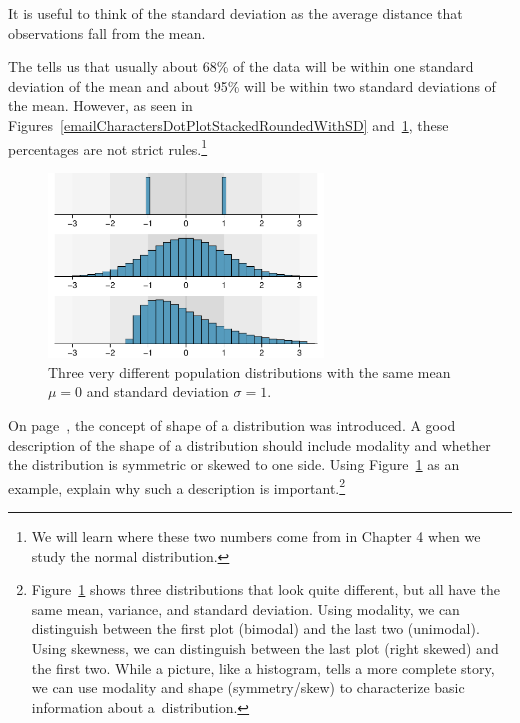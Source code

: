 \begin{tipBox}{
It is useful to think of the standard deviation as the average distance that observations fall from the mean.}
\end{tipBox}

The  tells us that usually about 68\% of the data will be within one standard deviation of the mean and about 95\% will be within two standard deviations of the mean. However, as seen in Figures~\ref{emailCharactersDotPlotStackedRoundedWithSD} and~\ref{severalDiffDistWithSdOf1}, these percentages are not strict rules.\footnote{We will learn where these two numbers come from in Chapter 4 when we study the normal distribution.}

\begin{figure}
\centering
\includegraphics[width=0.65\textwidth]{ch_summarizing_data/figures/severalDiffDistWithSdOf1/severalDiffDistWithSdOf1}
\caption{Three very different population distributions with the same mean $\mu=0$ and standard deviation $\sigma=1$.}
\label{severalDiffDistWithSdOf1}
\end{figure}

\begin{exercise}
On page~\pageref{shapeFirstDiscussed}, the concept of shape of a distribution was introduced. A good description of the shape of a distribution should include modality and whether the distribution is symmetric or skewed to one side. Using Figure~\ref{severalDiffDistWithSdOf1} as an example, explain why such a description is important.\footnote{Figure~\ref{severalDiffDistWithSdOf1} shows three distributions that look quite different, but all have the same mean, variance, and standard deviation. Using modality, we can distinguish between the first plot (bimodal) and the last two (unimodal). Using skewness, we can distinguish between the last plot (right skewed) and the first two. While a picture, like a histogram, tells a more complete story, we can use modality and shape (symmetry/skew) to characterize basic information about a~distribution.}
\end{exercise}

